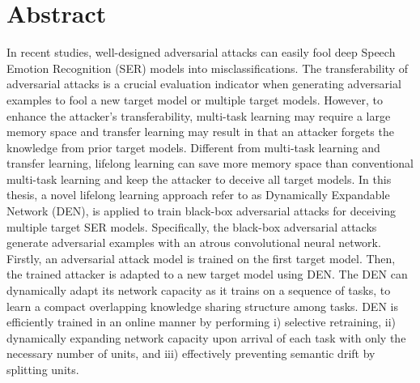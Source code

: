 \chapter*{Abstract}
\label{chap:Abstract}
\setcounter{page}{1}
In recent studies, well-designed adversarial attacks can easily fool deep Speech Emotion Recognition (SER) models into misclassifications. The transferability of adversarial attacks is a crucial evaluation indicator when generating adversarial examples to fool a new target model or multiple target models. However, to enhance the attacker's transferability, multi-task learning may require a large memory space and transfer learning may result in that an attacker forgets the knowledge from prior target models. Different from multi-task learning and transfer learning, lifelong learning can save more memory space than conventional multi-task learning and keep the attacker to deceive all target models.
In this thesis, a novel lifelong learning approach refer to as Dynamically Expandable Network (DEN), is applied to train black-box adversarial attacks for deceiving multiple target SER models. Specifically, the black-box adversarial attacks generate adversarial examples with an atrous convolutional neural network. Firstly, an adversarial attack model is trained on the first target model. Then, the trained attacker is adapted to a new target model using DEN. The DEN can dynamically adapt its network capacity as it trains on a sequence of tasks, to learn a compact overlapping knowledge sharing structure among tasks. DEN is efficiently trained in an online manner by performing i) selective retraining, ii) dynamically expanding network capacity upon arrival of each task with only the necessary number of units, and iii) effectively preventing semantic drift by splitting units. 




